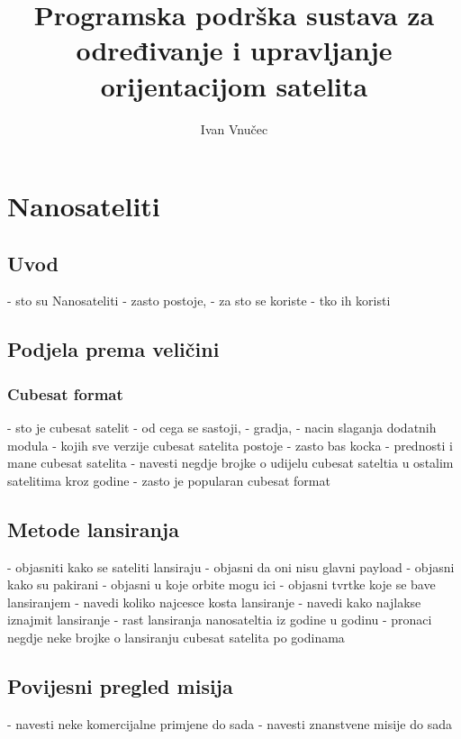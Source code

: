 \documentclass[times, utf8, diplomski, numeric]{templates/template}
\begin{document}

\title{Programska podrška sustava za određivanje i upravljanje orijentacijom satelita}


\author{Ivan Vnučec}

\maketitle

\izvornik


\tableofcontents

\nocite{*}
\chapter{Nanosateliti}{
    \section{Uvod}{
        - sto su Nanosateliti
        - zasto postoje, 
            - za sto se koriste
            - tko ih koristi
    }

    \section{Podjela prema veličini}{
        \subsection{Cubesat format}{
            - sto je cubesat satelit
            - od cega se sastoji, 
                - gradja, 
                - nacin slaganja dodatnih modula
            - kojih sve verzije cubesat satelita postoje
            - zasto bas kocka
            - prednosti i mane cubesat satelita
            - navesti negdje brojke o udijelu cubesat sateltia u ostalim satelitima kroz godine
            - zasto je popularan cubesat format
        }
    }

    \section{Metode lansiranja}{
        - objasniti kako se sateliti lansiraju
            - objasni da oni nisu glavni payload
            - objasni kako su pakirani
            - objasni u koje orbite mogu ici
            - objasni tvrtke koje se bave lansiranjem
        - navedi koliko najcesce kosta lansiranje
        - navedi kako najlakse iznajmit lansiranje
        - rast lansiranja nanosateltia iz godine u godinu
            - pronaci negdje neke brojke o lansiranju cubesat satelita po godinama
    }

    \section{Povijesni pregled misija}{
        - navesti neke komercijalne primjene do sada
        - navesti znanstvene misije do sada
    }
}
\end{document}

